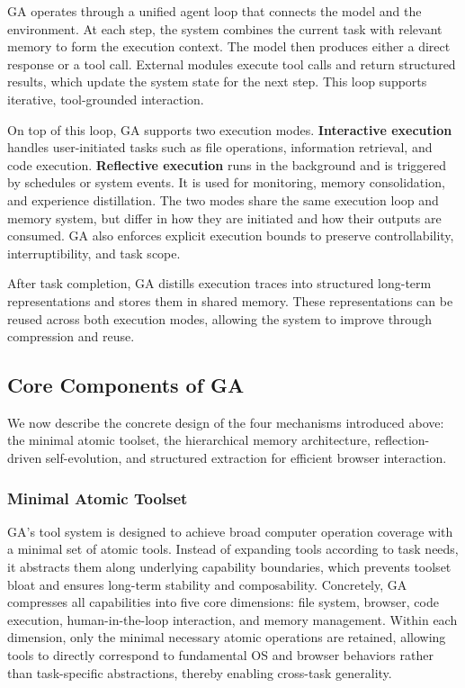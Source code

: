 GA operates through a unified agent loop that connects the model and the environment. At each step, the system combines the current task with relevant memory to form the execution context. The model then produces either a direct response or a tool call. External modules execute tool calls and return structured results, which update the system state for the next step. This loop supports iterative, tool-grounded interaction.

On top of this loop, GA supports two execution modes. \textbf{Interactive execution} handles user-initiated tasks such as file operations, information retrieval, and code execution. \textbf{Reflective execution} runs in the background and is triggered by schedules or system events. It is used for monitoring, memory consolidation, and experience distillation. The two modes share the same execution loop and memory system, but differ in how they are initiated and how their outputs are consumed. GA also enforces explicit execution bounds to preserve controllability, interruptibility, and task scope.

After task completion, GA distills execution traces into structured long-term representations and stores them in shared memory. These representations can be reused across both execution modes, allowing the system to improve through compression and reuse.

\subsection{Core Components of GA}
\label{sec:core_design}
We now describe the concrete design of the four mechanisms introduced above: the minimal atomic toolset, the hierarchical memory architecture, reflection-driven self-evolution, and structured extraction for efficient browser interaction.

\subsubsection{Minimal Atomic Toolset}
\label{sec:tools}
GA’s tool system is designed to achieve broad computer operation coverage with a minimal set of atomic tools. Instead of expanding tools according to task needs, it abstracts them along underlying capability boundaries, which prevents toolset bloat and ensures long-term stability and composability. Concretely, GA compresses all capabilities into five core dimensions: file system, browser, code execution, human-in-the-loop interaction, and memory management. Within each dimension, only the minimal necessary atomic operations are retained, allowing tools to directly correspond to fundamental OS and browser behaviors rather than task-specific abstractions, thereby enabling cross-task generality.

